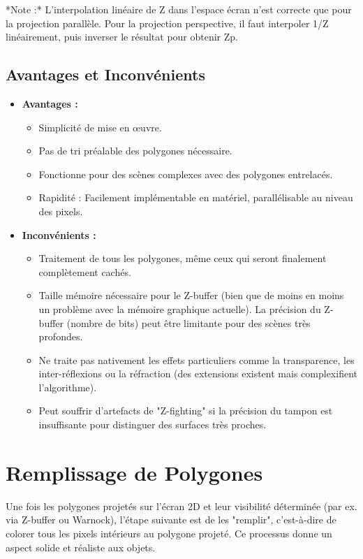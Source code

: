 \documentclass{article}
\begin{document}
*Note :* L'interpolation linéaire de Z dans l'espace écran n'est correcte que pour la projection parallèle. Pour la projection perspective, il faut interpoler 1/Z linéairement, puis inverser le résultat pour obtenir Zp.

\subsection{Avantages et Inconvénients}

\begin{itemize}
    \item \textbf{Avantages :}
        \begin{itemize}
            \item Simplicité de mise en œuvre.
            \item Pas de tri préalable des polygones nécessaire.
            \item Fonctionne pour des scènes complexes avec des polygones entrelacés.
            \item Rapidité : Facilement implémentable en matériel, parallélisable au niveau des pixels.
        \end{itemize}
    \item \textbf{Inconvénients :}
        \begin{itemize}
            \item Traitement de tous les polygones, même ceux qui seront finalement complètement cachés.
            \item Taille mémoire nécessaire pour le Z-buffer (bien que de moins en moins un problème avec la mémoire graphique actuelle). La précision du Z-buffer (nombre de bits) peut être limitante pour des scènes très profondes.
            \item Ne traite pas nativement les effets particuliers comme la transparence, les inter-réflexions ou la réfraction (des extensions existent mais complexifient l'algorithme).
            \item Peut souffrir d'artefacts de "Z-fighting" si la précision du tampon est insuffisante pour distinguer des surfaces très proches.
        \end{itemize}
\end{itemize}

\section{Remplissage de Polygones}

Une fois les polygones projetés sur l'écran 2D et leur visibilité déterminée (par ex. via Z-buffer ou Warnock), l'étape suivante est de les "remplir", c'est-à-dire de colorer tous les pixels intérieurs au polygone projeté. Ce processus donne un aspect solide et réaliste aux objets.
\end{document}
